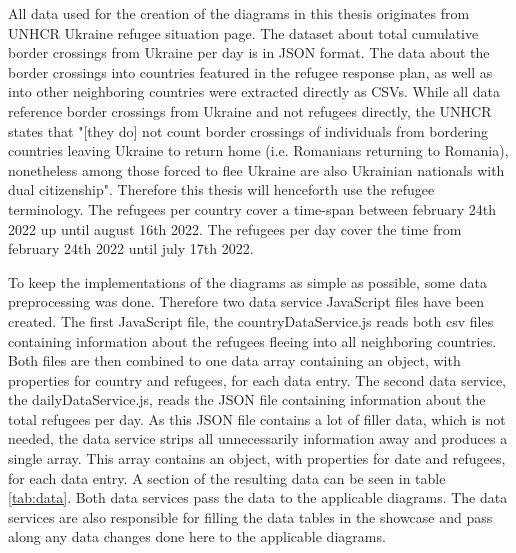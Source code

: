All data used for the creation of the diagrams in this thesis originates from UNHCR Ukraine refugee situation page\cite{unhcr}. The dataset about total cumulative border crossings from Ukraine per day\cite{unhcr_rpd} is in JSON format. The data about the border crossings into countries featured in the refugee response plan, as well as into other neighboring countries\cite{unhcr} were extracted directly as CSVs. While all data reference border crossings from Ukraine and not refugees directly, the UNHCR states that "[they do] not count border crossings of individuals from bordering countries leaving Ukraine to return home (i.e. Romanians returning to Romania), nonetheless among those forced to flee Ukraine are also Ukrainian nationals with dual citizenship"\cite{unhcr_note}. Therefore this thesis will henceforth use the refugee terminology.
The refugees per country cover a time-span between february 24th 2022 up until august 16th 2022\cite{unhcr}. The refugees per day cover the time from february 24th 2022 until july 17th 2022\cite{unhcr_rpd}.




To keep the implementations of the diagrams as simple as possible, some data preprocessing was done. Therefore two data service JavaScript files have been created. The first JavaScript file, the countryDataService.js reads both csv files containing information about the refugees fleeing into all neighboring countries. Both files are then combined to one data array containing an object, with properties for country and refugees, for each data entry. The second data service, the dailyDataService.js, reads the JSON file containing information about the total refugees per day. As this JSON file contains a lot of filler data, which is not needed, the data service strips all unnecessarily information away and produces a single array. This array contains an object, with properties for date and refugees, for each data entry. A section of the resulting data can be seen in table \ref{tab:data}. Both data services pass the data to the applicable diagrams. The data services are also responsible for filling the data tables in the showcase and pass along any data changes done here to the applicable diagrams.

